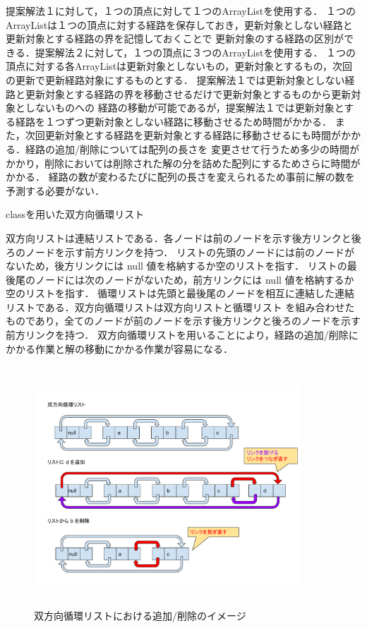 \documentclass[12pt]{optlab-bachelor}
\begin{document}
提案解法１に対して，１つの頂点に対して１つのArrayListを使用する．
１つのArrayListは１つの頂点に対する経路を保存しておき，更新対象としない経路と更新対象とする経路の界を記憶しておくことで
更新対象のする経路の区別ができる．提案解法２に対して，１つの頂点に３つのArrayListを使用する．
１つの頂点に対する各ArrayListは更新対象としないもの，更新対象とするもの，次回の更新で更新経路対象にするものとする．
提案解法１では更新対象としない経路と更新対象とする経路の界を移動させるだけで更新対象とするものから更新対象としないものへの
経路の移動が可能であるが，提案解法１では更新対象とする経路を１つずつ更新対象としない経路に移動させるため時間がかかる．
また，次回更新対象とする経路を更新対象とする経路に移動させるにも時間がかかる．経路の追加/削除については配列の長さを
変更させて行うため多少の時間がかかり，削除においては削除された解の分を詰めた配列にするためさらに時間がかかる．
経路の数が変わるたびに配列の長さを変えられるため事前に解の数を予測する必要がない．

\begin{description}
  \item[classを用いた双方向循環リスト]
\end{description}

双方向リストは連結リストである．各ノードは前のノードを示す後方リンクと後ろのノードを示す前方リンクを持つ．
リストの先頭のノードには前のノードがないため，後方リンクには null 値を格納するか空のリストを指す．
リストの最後尾のノードには次のノードがないため，前方リンクには null 値を格納するか空のリストを指す．
循環リストは先頭と最後尾のノードを相互に連結した連結リストである．双方向循環リストは双方向リストと循環リスト
を組み合わせたものであり，全てのノードが前のノードを示す後方リンクと後ろのノードを示す前方リンクを持つ．
双方向循環リストを用いることにより，経路の追加/削除にかかる作業と解の移動にかかる作業が容易になる．

\begin{figure}[htbp]
  \centering
  \caption{双方向循環リストにおける追加/削除のイメージ}
  \includegraphics[height=9.0cm, width=10.0cm]{fig/fig10.pdf}
\end{figure}
\end{document}

